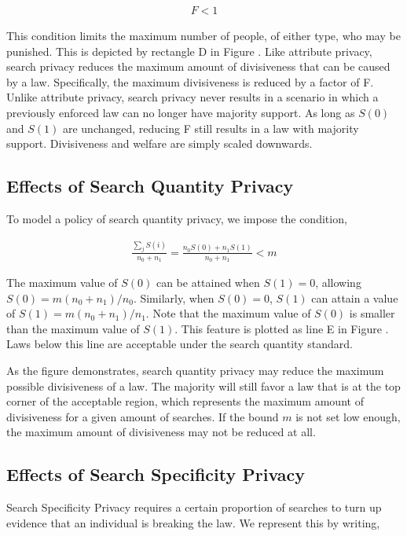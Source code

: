 \begin{align}
F<1
\end{align}

This condition limits the maximum number of people, of either type, who may be punished.  This is depicted by rectangle D in Figure .  Like attribute privacy, search privacy reduces the maximum amount of divisiveness that can be caused by a law.  Specifically, the maximum divisiveness is reduced by a factor of F.  Unlike attribute privacy, search privacy never results in a scenario in which a previously enforced law can no longer have majority support.  As long as $S(0)$ and $S(1)$ are unchanged, reducing F still results in a law with majority support.  Divisiveness and welfare are simply scaled downwards.

\subsection{Effects of Search Quantity Privacy}

To model a policy of search quantity privacy, we impose the condition, 

\begin{align}
\frac{\sum_j S(i)}{n_0 + n_1} = \frac{n_0 S(0) + n_1 S(1)}{n_0 + n_1}  < m
\end{align}

The maximum value of $S(0)$ can be attained when $S(1) = 0$, allowing $S(0) = m (n_0 + n_1)/n_0$.  Similarly, when $S(0) = 0$, $S(1)$ can attain a value of $S(1) = m (n_0 + n_1)/n_1$.   Note that the maximum value of $S(0)$ is smaller than the maximum value of $S(1)$.  This feature is plotted as line E in Figure .  Laws below this line are acceptable under the search quantity standard.  

As the figure demonstrates, search quantity privacy may reduce the maximum possible divisiveness of a law.  The majority will still favor a law that is at the top corner of the acceptable region, which represents the maximum amount of divisiveness for a given amount of searches.  If the bound $m$ is not set low enough, the maximum amount of divisiveness may not be reduced at all.

\subsection{Effects of Search Specificity Privacy}

Search Specificity Privacy requires a certain proportion of searches to turn up evidence that an individual is breaking the law.  We represent this by writing,

